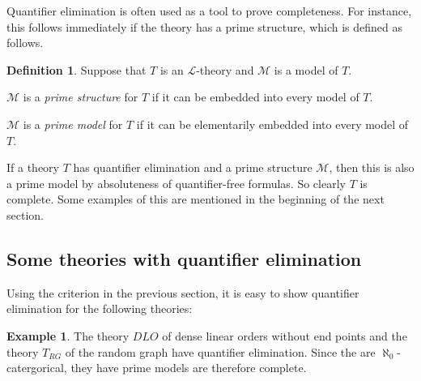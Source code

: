 \documentclass[10pt]{amsart}
\renewcommand{\L}{\mathcal{L}}
\newcommand{\MM}{\mathcal{M}}
\newcommand{\NN}{\mathcal{N}}
\theoremstyle{definition}
\newtheorem{definition}[theorem]{Definition}
\newtheorem{example}[theorem]{Example}
\theoremstyle{remark}
\newenvironment{enumerate-(a)}{\begin{enumerate}[label={\upshape (\alph*)}, leftmargin=2pc]}{\end{enumerate}}
\begin{document}
Quantifier elimination is often used as a tool to prove completeness. For instance, this follows immediately if the theory has a prime structure, which is defined as follows. 

\begin{definition} 
Suppose that $T$ is an $\L$-theory and $\MM$ is a model of $T$. 
\begin{enumerate-(a)} 
\item 
$\MM$ is a \emph{prime structure} for $T$ if it can be embedded into every model of $T$. 
\item 
$\MM$ is a \emph{prime model} for $T$ if it can be elementarily embedded into every model of $T$. 
\end{enumerate-(a)} 
\end{definition} 

If a theory $T$ has quantifier elimination and a prime structure $\MM$, then this is also a prime model by absoluteness of quantifier-free formulas. So clearly $T$ is complete. 
Some examples of this are mentioned in the beginning of the next section. 






\subsection{Some theories with quantifier elimination} \label{subsection: some theories with quantifier elimination} 

Using the criterion in the previous section, it is easy to show quantifier elimination for the following theories: 

\begin{example} 
The theory $DLO$ of dense linear orders without end points and the theory $T_{RG}$ of the random graph have quantifier elimination. Since the are $\aleph_0$-catergorical, they have prime models are therefore complete. 
\end{example} 


\end{document}

